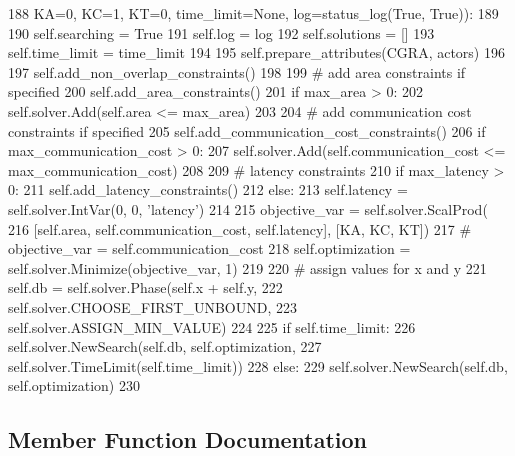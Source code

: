 \begin{DoxyCode}
188          KA=0, KC=1, KT=0, time\_limit=\textcolor{keywordtype}{None}, log=status\_log(\textcolor{keyword}{True}, \textcolor{keyword}{True})):
189 
190     self.searching = \textcolor{keyword}{True}
191     self.log = log
192     self.solutions = []
193     self.time\_limit = time\_limit
194 
195     self.prepare\_attributes(CGRA, actors)
196 
197     self.add\_non\_overlap\_constraints()
198 
199     \textcolor{comment}{# add area constraints if specified}
200     self.add\_area\_constraints()
201     \textcolor{keywordflow}{if} max\_area > 0:
202       self.solver.Add(self.area <= max\_area)
203 
204     \textcolor{comment}{# add communication cost constraints if specified}
205     self.add\_communication\_cost\_constraints()
206     \textcolor{keywordflow}{if} max\_communication\_cost > 0:
207       self.solver.Add(self.communication\_cost <= max\_communication\_cost)
208 
209     \textcolor{comment}{# latency constraints}
210     \textcolor{keywordflow}{if} max\_latency > 0:
211       self.add\_latency\_constraints()
212     \textcolor{keywordflow}{else}:
213       self.latency = self.solver.IntVar(0, 0, \textcolor{stringliteral}{'latency'})
214 
215     objective\_var = self.solver.ScalProd(
216       [self.area, self.communication\_cost, self.latency], [KA, KC, KT])
217     \textcolor{comment}{# objective\_var = self.communication\_cost}
218     self.optimization = self.solver.Minimize(objective\_var, 1)
219 
220     \textcolor{comment}{# assign values for x and y}
221     self.db = self.solver.Phase(self.x + self.y,
222                   self.solver.CHOOSE\_FIRST\_UNBOUND,
223                   self.solver.ASSIGN\_MIN\_VALUE)
224 
225     \textcolor{keywordflow}{if} self.time\_limit:
226       self.solver.NewSearch(self.db, self.optimization,
227                   self.solver.TimeLimit(self.time\_limit))
228     \textcolor{keywordflow}{else}:
229       self.solver.NewSearch(self.db, self.optimization)
230 
\end{DoxyCode}


\subsection{Member Function Documentation}
\mbox{\label{classsylva_1_1code__generation_1_1floorplanner_1_1floorplanner_a0be73170e12b6ac4ecb594d4dab14f0d}} 
